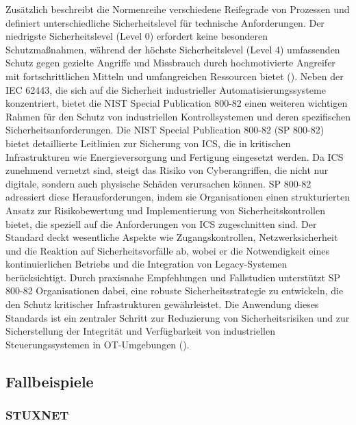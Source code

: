 Zusätzlich beschreibt die Normenreihe verschiedene Reifegrade von Prozessen und definiert unterschiedliche Sicherheitslevel für technische Anforderungen. Der niedrigste Sicherheitslevel (Level 0) erfordert keine besonderen Schutzmaßnahmen, während der höchste Sicherheitslevel (Level 4) umfassenden Schutz gegen gezielte Angriffe und Missbrauch durch hochmotivierte Angreifer mit fortschrittlichen Mitteln und umfangreichen Ressourcen bietet (\cite{ISecInsider}). Neben der IEC 62443, die sich auf die Sicherheit industrieller Automatisierungssysteme konzentriert, bietet die NIST Special Publication 800-82 einen weiteren wichtigen Rahmen für den Schutz von industriellen Kontrollsystemen und deren spezifischen Sicherheitsanforderungen. Die NIST Special Publication 800-82 (SP 800-82) bietet detaillierte Leitlinien zur Sicherung von ICS, die in kritischen Infrastrukturen wie Energieversorgung und Fertigung eingesetzt werden. Da ICS zunehmend vernetzt sind, steigt das Risiko von Cyberangriffen, die nicht nur digitale, sondern auch physische Schäden verursachen können. SP 800-82 adressiert diese Herausforderungen, indem sie Organisationen einen strukturierten Ansatz zur Risikobewertung und Implementierung von Sicherheitskontrollen bietet, die speziell auf die Anforderungen von ICS zugeschnitten sind. Der Standard deckt wesentliche Aspekte wie Zugangskontrollen, Netzwerksicherheit und die Reaktion auf Sicherheitsvorfälle ab, wobei er die Notwendigkeit eines kontinuierlichen Betriebs und die Integration von Legacy-Systemen berücksichtigt. Durch praxisnahe Empfehlungen und Fallstudien unterstützt SP 800-82 Organisationen dabei, eine robuste Sicherheitsstrategie zu entwickeln, die den Schutz kritischer Infrastrukturen gewährleistet. Die Anwendung dieses Standards ist ein zentraler Schritt zur Reduzierung von Sicherheitsrisiken und zur Sicherstellung der Integrität und Verfügbarkeit von industriellen Steuerungssystemen in OT-Umgebungen (\cite{NIST}).

\subsection{Fallbeispiele}
\subsubsection{STUXNET}

